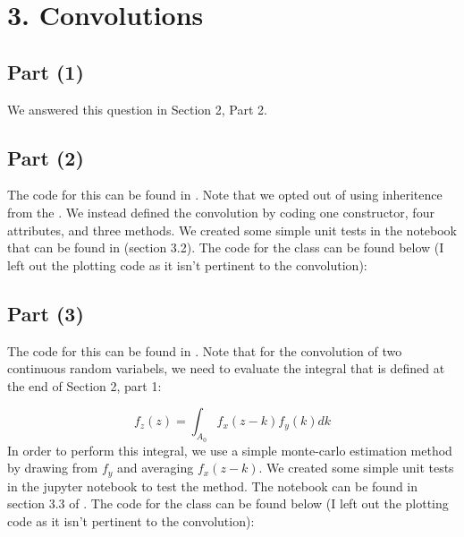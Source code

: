 \documentclass[10pt]{report}
\begin{document}
\section*{3. Convolutions}
\subsection*{Part (1)}
We answered this question in Section 2, Part 2.

\subsection*{Part (2)}

The code for this can be found in . Note that we opted out of using inheritence from the . We instead defined the convolution by coding one constructor, four attributes, and three methods. We created some simple unit tests in the notebook that can be found in  (section 3.2). The code for the class can be found below (I left out the plotting code as it isn't pertinent to the convolution):
    
\subsection*{Part (3)}
The code for this can be found in . Note that for the convolution of two continuous random variabels, we need to evaluate the integral that is defined at the end of Section 2, part 1:

\[f_z(z) = \int_{A_0} f_{x}(z - k) f_{y} (k) dk\]
In order to perform this integral, we use a simple monte-carlo estimation method by drawing from $f_y$ and averaging $f_x(z-k)$. We created some simple unit tests in the jupyter notebook to test the method. The notebook can be found in section 3.3 of . The code for the class can be found below (I left out the plotting code as it isn't pertinent to the convolution):
\end{document}
